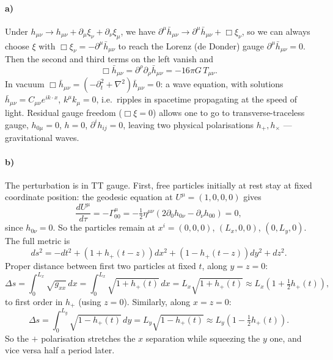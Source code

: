 \documentclass[11pt]{article}
\newcommand{\bh}{\bar{h}}
\begin{document}
\paragraph{a)} Under $h_{\mu\nu}\to h_{\mu\nu}+\partial_\mu\xi_\nu+\partial_\nu\xi_\mu$, we have $\partial^\mu\bh_{\mu\nu}\to\partial^\mu\bh_{\mu\nu}+\Box\xi_\nu$, so we can always choose $\xi$ with $\Box\xi_\nu=-\partial^\mu\bh_{\mu\nu}$ to reach the Lorenz (de Donder) gauge $\partial^\mu\bh_{\mu\nu}=0$. Then the second and third terms on the left vanish and
\[
\Box\bh_{\mu\nu}=\partial^\rho\partial_\rho\bh_{\mu\nu}=-16\pi G\,T_{\mu\nu}.
\]
In vacuum $\Box\bh_{\mu\nu}=(-\partial_t^2+\nabla^2)\bh_{\mu\nu}=0$: a wave equation, with solutions $\bh_{\mu\nu}=C_{\mu\nu}e^{ik\cdot x}$, $k^\mu k_\mu=0$, i.e.\ ripples in spacetime propagating at the speed of light. Residual gauge freedom ($\Box\xi=0$) allows one to go to transverse-traceless gauge, $h_{0\mu}=0$, $h=0$, $\partial^ih_{ij}=0$, leaving two physical polarisations $h_+,h_\times$ --- gravitational waves.

\paragraph{b)} The perturbation is in TT gauge. First, free particles initially at rest stay at fixed coordinate position: the geodesic equation at $U^\mu=(1,0,0,0)$ gives
\[
\frac{dU^\mu}{d\tau}=-\Gamma^\mu_{00}=-\tfrac12\eta^{\mu\nu}(2\partial_0h_{0\nu}-\partial_\nu h_{00})=0,
\]
since $h_{0\nu}=0$. So the particles remain at $x^i=(0,0,0)$, $(L_x,0,0)$, $(0,L_y,0)$. The full metric is
\[
ds^2=-dt^2+(1+h_+(t-z))dx^2+(1-h_+(t-z))dy^2+dz^2.
\]
Proper distance between first two particles at fixed $t$, along $y=z=0$:
\[
\Delta s=\int_0^{L_x}\sqrt{g_{xx}}\,dx=\int_0^{L_x}\sqrt{1+h_+(t)}\,dx=L_x\sqrt{1+h_+(t)}\approx L_x\left(1+\tfrac12h_+(t)\right),
\]
to first order in $h_+$ (using $z=0$). Similarly, along $x=z=0$:
\[
\Delta s=\int_0^{L_y}\sqrt{1-h_+(t)}\,dy=L_y\sqrt{1-h_+(t)}\approx L_y\left(1-\tfrac12h_+(t)\right).
\]
So the $+$ polarisation stretches the $x$ separation while squeezing the $y$ one, and vice versa half a period later.
\end{document}
